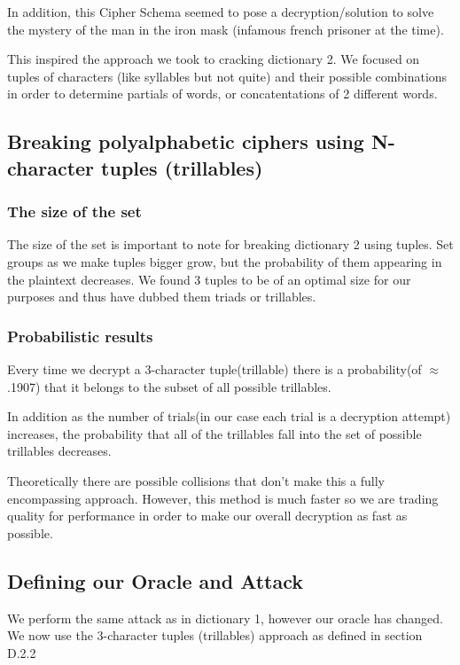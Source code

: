\documentclass[pdftex,12pt,letter]{article}
\begin{document}
In addition, this Cipher Schema seemed to pose a decryption/solution to solve the 
mystery of the man in the iron mask (infamous french prisoner at the time). 

This inspired the approach we took to cracking dictionary 2. We focused on 
tuples of characters (like syllables but not quite) and their possible combinations
in order to determine partials of words, or concatentations of 2 different words. 


\subsection{Breaking polyalphabetic ciphers using N-character tuples (trillables)}

\subsubsection{The size of the set}
The size of the set is important to note for breaking dictionary 2 using tuples. 
Set groups as we make tuples bigger grow, but the probability of them appearing
in the plaintext decreases. We found 3 tuples to be of an optimal size for our
purposes and thus have dubbed them triads or trillables. 
\subsubsection{Probabilistic results}
Every time we decrypt a 3-character tuple(trillable) there is a 
probability(of $\approx$ .1907) that it belongs to the subset of all possible trillables. 

In addition as the number of trials(in our case each trial is a decryption attempt) 
increases, the probability that all of the trillables fall into the set of possible trillables 
decreases.  

Theoretically there are possible collisions that don't make this a fully encompassing approach. 
However, this method is much faster so we are trading quality for performance in order to make 
our overall decryption as fast as possible.

\subsection{Defining our Oracle and Attack} 
We perform the same attack as in dictionary 1, however our oracle has changed. 
We now use the 3-character tuples (trillables) approach as defined in section D.2.2 
 
\end{document}
